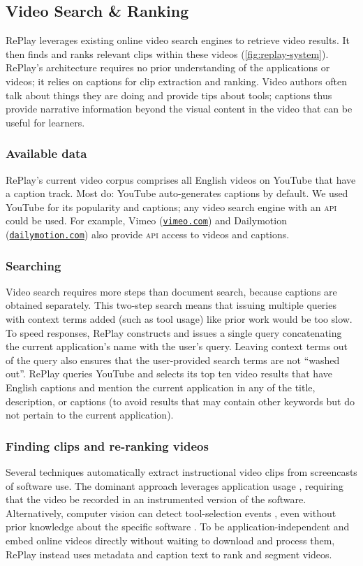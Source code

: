 \subsection{Video Search \& Ranking}
RePlay leverages existing online video search engines to retrieve video results. It then finds and ranks relevant clips within these videos (\autoref{fig:replay-system}). RePlay's architecture requires no prior understanding of the applications or videos; it relies on captions for clip extraction and ranking. Video authors often talk about things they are doing and provide tips about tools; captions thus provide narrative information beyond the visual content in the video that can be useful for learners.

\subsubsection{Available data}
RePlay's current video corpus comprises all English videos on YouTube that have a caption track. Most do: YouTube auto-generates captions by default. We used YouTube for its popularity and captions; any video search engine with an \textsc{api} could be used. For example, Vimeo (\href{https://vimeo.com}{\nolinkurl{vimeo.com}}) and Dailymotion (\href{https://dailymotion.com}{\nolinkurl{dailymotion.com}}) also provide \textsc{api} access to videos and captions.

\subsubsection{Searching}
Video search requires more steps than document search, because captions are obtained separately. This two-step search means that issuing multiple queries with context terms added (such as tool usage) like prior work \cite{Ekstrand2011} would be too slow. To speed responses, RePlay constructs and issues a single query concatenating the current application's name with the user's query. Leaving context terms out of the query also ensures that the user-provided search terms are not ``washed out''. RePlay queries YouTube and selects its top ten video results that have English captions and mention the current application in any of the title, description, or captions (to avoid results that may contain other keywords but do not pertain to the current application).

\subsubsection{Finding clips and re-ranking videos}
Several techniques automatically extract instructional video clips from screencasts of software use. The dominant approach leverages application usage \cite{Grossman2010, Lafreniere2014, Chi2012, Wang2018}, requiring that the video be recorded in an instrumented version of the software. Alternatively, computer vision can detect tool-selection events \cite{Pongnumkul2011, Matejka2011}, even without prior knowledge about the specific software \cite{Banovic2012}. To be application-independent and embed online videos directly without waiting to download and process them, RePlay instead uses metadata and caption text to rank and segment videos. 

